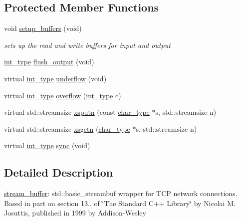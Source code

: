 \subsection*{Protected Member Functions}
\begin{DoxyCompactItemize}
\item 
void \hyperlink{classpion_1_1tcp_1_1stream__buffer_a02de69010776b51162faa62f3188faa1}{setup\-\_\-buffers} (void)
\begin{DoxyCompactList}\small\item\em sets up the read and write buffers for input and output \end{DoxyCompactList}\item 
\hyperlink{classpion_1_1tcp_1_1stream__buffer_a7dcf4943671520d4018b4468c336e86e}{int\-\_\-type} \hyperlink{classpion_1_1tcp_1_1stream__buffer_a3fb6c729f62844f052043c472f92b59f}{flush\-\_\-output} (void)
\item 
virtual \hyperlink{classpion_1_1tcp_1_1stream__buffer_a7dcf4943671520d4018b4468c336e86e}{int\-\_\-type} \hyperlink{classpion_1_1tcp_1_1stream__buffer_a94d2c63cb6994188b2628fc09480eb85}{underflow} (void)
\item 
virtual \hyperlink{classpion_1_1tcp_1_1stream__buffer_a7dcf4943671520d4018b4468c336e86e}{int\-\_\-type} \hyperlink{classpion_1_1tcp_1_1stream__buffer_ae36650cd6ed06cee158907766f4e10e7}{overflow} (\hyperlink{classpion_1_1tcp_1_1stream__buffer_a7dcf4943671520d4018b4468c336e86e}{int\-\_\-type} c)
\item 
virtual std\-::streamsize \hyperlink{classpion_1_1tcp_1_1stream__buffer_ac61f64d668dd49e4f57d518f500eac61}{xsputn} (const \hyperlink{classpion_1_1tcp_1_1stream__buffer_a1fa60cd7dbf11eebb2983fe2a115a2e4}{char\-\_\-type} $\ast$s, std\-::streamsize n)
\item 
virtual std\-::streamsize \hyperlink{classpion_1_1tcp_1_1stream__buffer_a96821e24e504729ff2a48579c208b21a}{xsgetn} (\hyperlink{classpion_1_1tcp_1_1stream__buffer_a1fa60cd7dbf11eebb2983fe2a115a2e4}{char\-\_\-type} $\ast$s, std\-::streamsize n)
\item 
virtual \hyperlink{classpion_1_1tcp_1_1stream__buffer_a7dcf4943671520d4018b4468c336e86e}{int\-\_\-type} \hyperlink{classpion_1_1tcp_1_1stream__buffer_afd7b30acfb1a4c9897ae61e4a6731a58}{sync} (void)
\end{DoxyCompactItemize}


\subsection{Detailed Description}
\hyperlink{classpion_1_1tcp_1_1stream__buffer}{stream\-\_\-buffer}\-: std\-::basic\-\_\-streambuf wrapper for T\-C\-P network connections. Based in part on section 13.. of \char`\"{}\-The Standard C++ Library\char`\"{} by Nicolai M. Josuttis, published in 1999 by Addison-\/\-Wesley 

